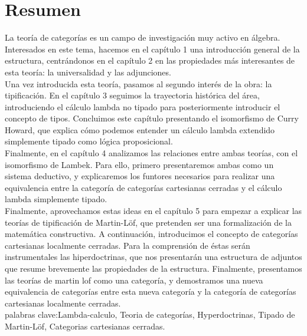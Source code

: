 \newpage
{}
\section*{Resumen}
La teoría de categorías es un campo de investigación muy activo en álgebra. Interesados en este tema, hacemos en el capítulo 1 una introducción general de la estructura, centrándonos en el capítulo 2 en las propiedades más interesantes de esta teoría: la universalidad y las adjunciones. \\

Una vez introducida esta teoría, pasamos al segundo interés de la obra: la tipificación. En el capítulo 3 seguimos la trayectoria histórica del área, introduciendo el cálculo lambda no tipado para posteriormente introducir el concepto de tipos. Concluimos este capítulo presentando el isomorfismo de Curry Howard, que explica cómo podemos entender un cálculo lambda extendido simplemente tipado como lógica proposicional.\\

Finalmente, en el capítulo 4 analizamos las relaciones entre ambas teorías, con el isomorfismo de Lambek. Para ello, primero presentaremos ambas como un sistema deductivo, y explicaremos los funtores necesarios para realizar una equivalencia entre la categoría de categorías cartesianas cerradas y el cálculo lambda simplemente tipado.\\

 Finalmente, aprovechamos estas ideas en el capítulo 5 para empezar a explicar las teorías de tipificación de Martin-L\"of, que pretenden ser una formalización de la matemática constructiva. A continuación, introducimos el concepto de categorías cartesianas localmente cerradas. Para la comprensión de éstas serán instrumentales las hiperdoctrinas, que nos presentarán una estructura de adjuntos que resume brevemente las propiedades de la estructura. Finalmente, presentamos las teorías de martin lof como una categoría, y demostramos una nueva equivalencia de categorías entre esta nueva categoría y la categoría de categorías cartesianas localmente cerradas. \\

{palabras clave:Lambda-calculo, Teoria de categor\'ias, Hyperdoctrinas, Tipado de Martin-L\"of, Categorias cartesianas cerradas.} 




